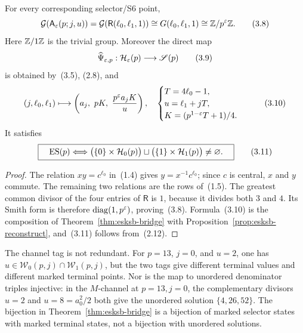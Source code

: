 \begin{corollary}
For every corresponding selector/S6 point,
\begin{equation}
 \mathcal G(\mathsf A_\varepsilon(p;j,u))
 =\mathcal G(\mathsf R(\ell_0,\ell_1,1))
 \cong G(\ell_0,\ell_1,1)
 \cong\mathbb Z/p^\varepsilon\mathbb Z.                                       \tag{3.8}
\end{equation}
Here \(\mathbb Z/1\mathbb Z\) is the trivial group.  Moreover the direct map
\begin{equation}
 \widehat\Psi_{\varepsilon,p}:\mathcal H_\varepsilon(p)\longrightarrow\mathscr S(p)
                                                                    \tag{3.9}
\end{equation}
is obtained by~(3.5), (2.8), and
\begin{equation}
 (j,\ell_0,\ell_1)\longmapsto
 \left(a_j,\ pK,\ \frac{p^\varepsilon a_jK}{u}\right),
 \quad
 \begin{cases}
 T=4\ell_0-1,\\
 u=\ell_1+jT,\\
 K=(p^{1-\varepsilon}T+1)/4.
 \end{cases}                                                \tag{3.10}
\end{equation}
It satisfies
\begin{equation}
 \boxed{\quad
 \operatorname{ES}(p)\Longleftrightarrow
 \bigl(\{0\}\times\mathcal H_0(p)\bigr)\sqcup
 \bigl(\{1\}\times\mathcal H_1(p)\bigr)\neq\varnothing.
 \quad}                                                       \tag{3.11}
\end{equation}
\end{corollary}

\begin{proof}
The relation \(xy=c^{\ell_0}\) in~(1.4) gives
\(y=x^{-1}c^{\ell_0}\); since \(c\) is central, \(x\) and \(y\) commute.
The remaining two relations are the rows of~(1.5).  The greatest common
divisor of the four entries of \(\mathsf R\) is \(1\), because it divides
both \(3\) and \(4\).  Its Smith form is therefore
\(\operatorname{diag}(1,p^\varepsilon)\), proving~(3.8).  Formula~(3.10) is the
composition of Theorem~\ref{thm:esksb-bridge} with
Proposition~\ref{prop:esksb-reconstruct}, and~(3.11) follows from~(2.12).
\end{proof}

\begin{remark}
The channel tag is not redundant.  For \(p=13\), \(j=0\), and \(u=2\),
one has \(u\in\mathcal W_0(p,j)\cap\mathcal W_1(p,j)\), but the two tags
give different terminal values and different marked terminal points.  Nor is
the map to unordered denominator triples injective: in the \(M\)-channel at
\(p=13,j=0\), the complementary divisors \(u=2\) and \(u=8=a_0^2/2\)
both give the unordered solution \(\{4,26,52\}\).  The bijection in
Theorem~\ref{thm:esksb-bridge} is a bijection of marked selector states with marked
terminal states, not a bijection with unordered solutions.
\end{remark}

